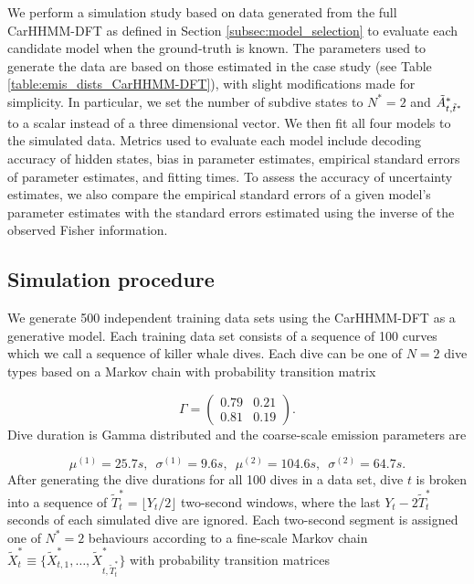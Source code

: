 
We perform a simulation study based on data generated from the full CarHHMM-DFT as defined in Section \ref{subsec:model_selection} to evaluate each candidate model when the ground-truth is known. The parameters used to generate the data are based on those estimated in the case study (see Table \ref{table:emis_dists_CarHHMM-DFT}), with slight modifications made for simplicity. In particular, we set the number of subdive states to $N^*=2$ and $\tilde{A}^*_{t,\tilde t^*}$ to a scalar instead of a three dimensional vector. We then fit all four models to the simulated data. Metrics used to evaluate each model include decoding accuracy of hidden states, bias in parameter estimates, empirical standard errors of parameter estimates, and fitting times. To assess the accuracy of uncertainty estimates, we also compare the empirical standard errors of a given model's parameter estimates with the standard errors estimated using the inverse of the observed Fisher information.

\subsection{Simulation procedure}
\label{subsec:data_simulation}

We generate 500 independent training data sets using the CarHHMM-DFT as a generative model. Each training data set consists of a sequence of 100 curves which we call a sequence of killer whale dives. Each dive can be one of $N=2$ dive types based on a Markov chain with probability transition matrix

\[\Gamma = \begin{pmatrix} 0.79 & 0.21 \\ 0.81 & 0.19 \end{pmatrix}.\]
%
Dive duration is Gamma distributed and the coarse-scale emission parameters are 

\[\mu^{(1)} = 25.7s, \enspace \sigma^{(1)} = 9.6s, \enspace \mu^{(2)} = 104.6s, \enspace \sigma^{(2)} = 64.7s.\]
%
After generating the dive durations for all 100 dives in a data set, dive $t$ is broken into a sequence of $\tilde T^*_t = \lfloor Y_t/2 \rfloor$ two-second windows, where the last $Y_t - 2 \tilde T^*_t$ seconds of each simulated dive are ignored. Each two-second segment is assigned one of $N^*=2$ behaviours according to a fine-scale Markov chain $\tilde X^*_t \equiv \big\{\tilde X^*_{t,1}, \ldots, \tilde X^*_{t,\tilde T^*_t} \big\}$ with probability transition matrices

